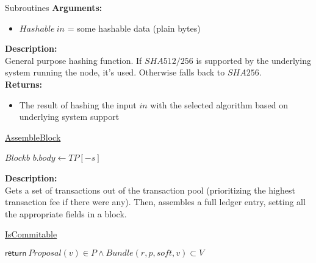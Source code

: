 \documentclass[10pt,a4paper]{article}
\begin{document}
\begin{section}{Subroutines}
\noindent \textbf{Arguments:}
\begin{itemize}
    \item $Hashable \ in$ = some hashable data (plain bytes)
  \end{itemize}

\noindent \textbf{Description:}\\
General purpose hashing function. If $SHA512/256$ is supported by the underlying system running the node, it's used.
Otherwise falls back to $SHA256$.\\

\noindent \textbf{Returns:}
\begin{itemize}
    \item The result of hashing the input $in$ with the selected algorithm based on underlying system support
  \end{itemize}


\begin{algorithm}[H]
    \caption{\underline{AssembleBlock}}    
    \label{algo:assemble-block}
    \begin{algorithmic}[1]

    \State $Block b$
    \State $b.body \gets TP[-s]$

    \EndFunction
    \end{algorithmic}
\end{algorithm}

\noindent \textbf{Description:}\\
Gets a set of transactions out of the transaction pool (prioritizing the highest transaction fee if there were any).
Then, assembles a full ledger entry, setting all the appropriate fields in a block.


\begin{algorithm}[H]
    \caption{\underline{IsCommitable}}
    \label{algo:is-commitable}
    \begin{algorithmic}[1]

    \State $\mathsf{return} \ Proposal(v) \in P \land Bundle(r,p,soft,v) \subset V$

    \EndFunction
    \end{algorithmic}
\end{algorithm}



\end{section}
\end{document}
